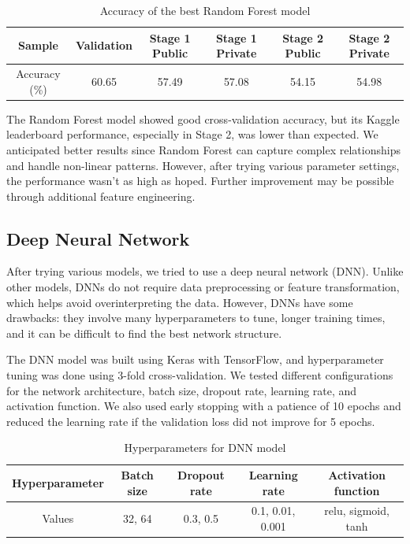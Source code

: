 \documentclass[10pt,a4paper]{article}
\begin{document}
\begin{table}[H]
  \centering
  \begin{tabular}{|c|c|c|c|c|c|}
  \hline
  Sample & Validation & Stage 1 Public & Stage 1 Private & Stage 2 Public & Stage 2 Private \\ \hline
  Accuracy (\%) & 60.65 & 57.49 & 57.08 & 54.15 & 54.98 \\ \hline
  \end{tabular}
  \caption{Accuracy of the best Random Forest model}
\end{table}

The Random Forest model showed good cross-validation accuracy, but its Kaggle leaderboard performance, especially in Stage 2, was lower than expected. We anticipated better results since Random Forest can capture complex relationships and handle non-linear patterns. However, after trying various parameter settings, the performance wasn't as high as hoped. Further improvement may be possible through additional feature engineering.










\subsection{Deep Neural Network}

After trying various models, we tried to use a deep neural network (DNN). Unlike other models, DNNs do not require data preprocessing or feature transformation, which helps avoid overinterpreting the data. However, DNNs have some drawbacks: they involve many hyperparameters to tune, longer training times, and it can be difficult to find the best network structure.

The DNN model was built using Keras with TensorFlow, and hyperparameter tuning was done using 3-fold cross-validation. We tested different configurations for the network architecture, batch size, dropout rate, learning rate, and activation function. We also used early stopping with a patience of 10 epochs and reduced the learning rate if the validation loss did not improve for 5 epochs.


\begin{table}[H]
  \centering
  \begin{tabular}{|c|c|c|c|c|}
  \hline
  Hyperparameter & Batch size & Dropout rate & Learning rate & Activation function \\ \hline
  Values & 32, 64 & 0.3, 0.5 & 0.1, 0.01, 0.001 & relu, sigmoid, tanh \\ \hline
  \end{tabular}
  \caption{Hyperparameters for DNN model}
\end{table}
\end{document}
